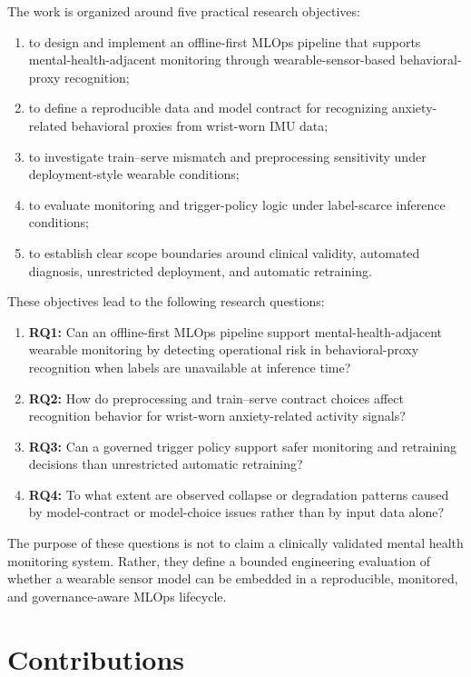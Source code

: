 The work is organized around five practical research objectives:

\begin{enumerate}
    \item to design and implement an offline-first MLOps pipeline that supports mental-health-adjacent monitoring through wearable-sensor-based behavioral-proxy recognition;
    \item to define a reproducible data and model contract for recognizing anxiety-related behavioral proxies from wrist-worn IMU data;
    \item to investigate train--serve mismatch and preprocessing sensitivity under deployment-style wearable conditions;
    \item to evaluate monitoring and trigger-policy logic under label-scarce inference conditions;
    \item to establish clear scope boundaries around clinical validity, automated diagnosis, unrestricted deployment, and automatic retraining.
\end{enumerate}

These objectives lead to the following research questions:

\begin{enumerate}
    \item \textbf{RQ1:} Can an offline-first MLOps pipeline support mental-health-adjacent wearable monitoring by detecting operational risk in behavioral-proxy recognition when labels are unavailable at inference time?
    \item \textbf{RQ2:} How do preprocessing and train--serve contract choices affect recognition behavior for wrist-worn anxiety-related activity signals?
    \item \textbf{RQ3:} Can a governed trigger policy support safer monitoring and retraining decisions than unrestricted automatic retraining?
    \item \textbf{RQ4:} To what extent are observed collapse or degradation patterns caused by model-contract or model-choice issues rather than by input data alone?
\end{enumerate}

The purpose of these questions is not to claim a clinically validated mental health monitoring system. Rather, they define a bounded engineering evaluation of whether a wearable sensor model can be embedded in a reproducible, monitored, and governance-aware MLOps lifecycle.

\section{Contributions}

